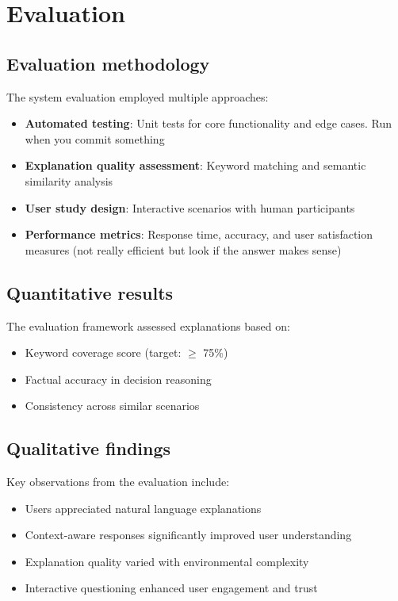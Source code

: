 \section{Evaluation}

\subsection{Evaluation methodology}

The system evaluation employed multiple approaches:
\begin{itemize}
    \item \textbf{Automated testing}: Unit tests for core functionality and edge cases. Run when you commit something
    \item \textbf{Explanation quality assessment}: Keyword matching and semantic similarity analysis
    \item \textbf{User study design}: Interactive scenarios with human participants
    \item \textbf{Performance metrics}: Response time, accuracy, and user satisfaction measures (not really efficient but look if the answer makes sense)
\end{itemize}

\subsection{Quantitative results}

The evaluation framework assessed explanations based on:
\begin{itemize}
    \item Keyword coverage score (target: $\geq$ 75\%)
    \item Factual accuracy in decision reasoning
    \item Consistency across similar scenarios
\end{itemize}

\subsection{Qualitative findings}

Key observations from the evaluation include:
\begin{itemize}
    \item Users appreciated natural language explanations
    \item Context-aware responses significantly improved user understanding
    \item Explanation quality varied with environmental complexity
    \item Interactive questioning enhanced user engagement and trust
\end{itemize}

